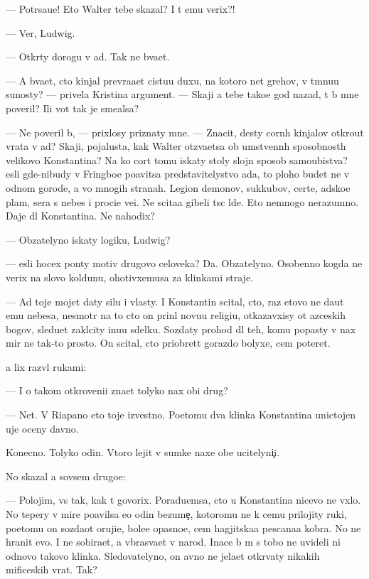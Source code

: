 \documentclass[10pt]{book}
\begin{document}
— Potr{\ia}sa{\y}u{\x}e! Eto Walter tebe skazal? I t{\yi} {\y}emu verix?!

— Ver{\io}, Ludwig.

— Otkr{\yi}ty do\-ro\-gu v ad. Tak ne b{\yi}\-va\-{\y}et.

— A b{\yi}\-va\-{\y}et, cto kinjal prevra{\x}a{\y}et cistu{\y}u duxu, na kotoro{\y} net grehov, v t{\e}mnu{\y}u su{\x}nosty? — privela Kristina argument. — Skaji {\y}a tebe tako{\y}e god nazad, t{\yi} b{\yi} mne poveril? Ili vot tak je sme{\y}alsa?

— Ne poveril b{\yi}, — pri\-xlosy priznaty mne. — Znacit, des{\ia}ty corn{\yi}h kinjalov otkro{\y}ut vra\-ta v ad? Skaji, pojalu{\y}sta, kak Walter otz{\yi}va{\y}etsa ob umstvenn{\yi}h spo\-sob\-no\-st{\ia}h velikovo Konstantina? Na ko{\y} cort tomu iskaty stoly slojn{\yi}{\y} sposob samo\-ubi{\y}\-stva? {\Y}esli gde-nibudy v Fringboe po{\y}avitsa predstavitelystvo ada, to ploho budet ne v odnom gorode, a vo mnogih stranah. Legion{\yi} demonov, sukkubov, certe{\y}, adsko{\y}e plam{\ia}, sera s nebes i proci{\y}e ve{\x}i. Ne scita{\y}a gibeli t{\yi}s{\ia}c l{\io}de{\y}. Eto nemnogo nerazumno. Daje dl{\ia} Konstantina. Ne nahodix?

— Ob{\ia}zatelyno iskaty logiku, Ludwig?

— {\Y}esli hocex pon{\ia}ty motiv{\yi} drugovo celoveka? Da. Ob{\ia}zatelyno. Osobenno kogda ne verix na slovo koldunu, ohotivxemusa za klinkami straje{\y}.

— Ad toje mojet daty silu i vlas\-ty. I Konstantin scital, cto, raz etovo ne da{\y}ut {\y}emu nebesa, ne\-smo\-tr{\ia} na to cto on prin{\ia}l novu{\y}u religi{\y}u, otkazavxisy ot {\y}az{\yi}ceskih bogov, sledu{\y}et zakl{\io}city inu{\y}u sdelku. Sozdaty prohod dl{\ia} teh, komu popasty v nax mir ne tak-to prosto. On scital, cto priobret{\e}t gorazdo bolyxe, cem poter{\ia}{\y}et.

{\Y}a lix razv{\e}l rukami:

— I o takom otkroveni{\y}i zna{\y}et tolyko nax ob{\x}i{\y} drug?

— Net. V Riapano eto toje izvestno. Poetomu dva klinka Konstantina uni\-cto\-jen{\yi} uje oceny davno.

Konecno. Tolyko odin. Vtoro{\y} lejit v sumke naxe{\y} ob{\x}e{\y} ucitelyni{\c}i.

No skazal {\y}a sovsem drugo{\y}e:

— Polojim, vs{\e} tak, kak t{\yi} govorix. Poradu{\y}emsa, cto u Konstantina nicevo ne v{\yi}xlo. No tepery v mire po{\y}avilsa {\y}e{\x}o odin bezume{\c}, kotoromu ne k cemu prilojity ruki, poetomu on sozda{\y}ot oruji{\y}e, bole{\y}e opasno{\y}e, cem hagjitska{\y}a pescana{\y}a kobra. No ne hranit {\y}evo. I ne sobira{\y}et, a v{\yi}bras{\yi}va{\y}et v narod. Inace b{\yi} m{\yi} s tobo{\y} ne uvideli ni odnovo takovo klinka. Sledovatelyno, on {\y}avno ne jela{\y}et otkr{\yi}vaty nikakih mificeskih vrat. Tak?
\end{document}
